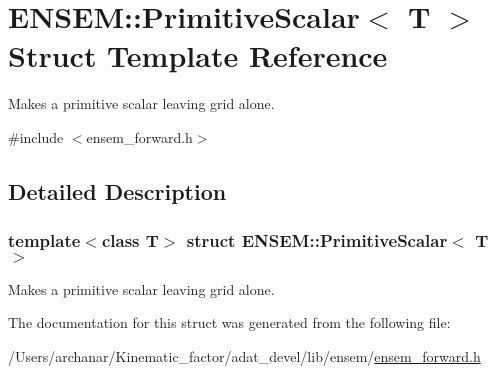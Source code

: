 \hypertarget{structENSEM_1_1PrimitiveScalar}{}\section{E\+N\+S\+EM\+:\+:Primitive\+Scalar$<$ T $>$ Struct Template Reference}
\label{structENSEM_1_1PrimitiveScalar}


Makes a primitive scalar leaving grid alone.  




{\ttfamily \#include $<$ensem\+\_\+forward.\+h$>$}



\subsection{Detailed Description}
\subsubsection*{template$<$class T$>$\newline
struct E\+N\+S\+E\+M\+::\+Primitive\+Scalar$<$ T $>$}

Makes a primitive scalar leaving grid alone. 

The documentation for this struct was generated from the following file\+:\begin{DoxyCompactItemize}
\item 
/\+Users/archanar/\+Kinematic\+\_\+factor/adat\+\_\+devel/lib/ensem/\mbox{\hyperlink{lib_2ensem_2ensem__forward_8h}{ensem\+\_\+forward.\+h}}\end{DoxyCompactItemize}
